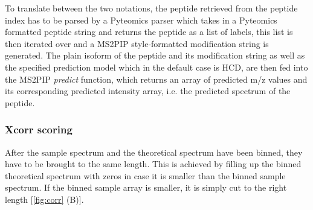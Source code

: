 \documentclass[11pt]{article}
\begin{document}
To translate between the two notations, the peptide retrieved from the peptide index has to be parsed by a Pyteomics parser which takes in a Pyteomics formatted peptide string and returns the peptide as a list of labels, this list is then iterated over and a MS2PIP style-formatted modification string is generated. The plain isoform of the peptide and its modification string as well as the specified prediction model which in the default case is HCD, are then fed into the MS2PIP \textit{predict} function, which returns an array of predicted m/z values and its corresponding predicted intensity array, i.e. the predicted spectrum of the peptide.

\subsubsection{Xcorr scoring}
After the sample spectrum and the theoretical spectrum have been binned, they have to be brought to the same length. This is achieved by filling up the binned theoretical spectrum with zeros in case it is smaller than the binned sample spectrum. If the binned sample array is smaller, it is simply cut to the right length [\cref{fig:corr} (B)].
\end{document}
